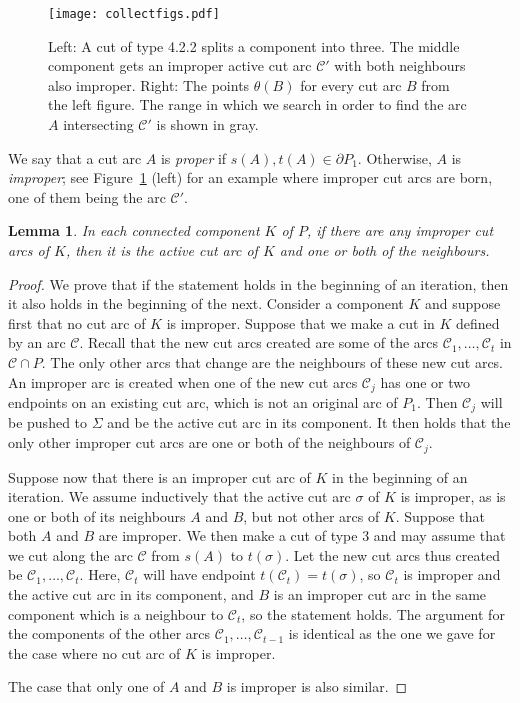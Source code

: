 \documentclass{article}
\newcommand{\PP}{P}
\newcommand{\KO}{K}
\newcommand{\stack}{\Sigma}
\newcommand{\se}{\sigma}
\newcommand{\cut}{\mathcal C}
\newcommand{\start}{s}
\newcommand{\terminal}{t}
\newcommand{\arcA}{A}
\newcommand{\arcB}{B}
\newtheorem{lemma}[theorem]{Lemma}
\begin{document}
\begin{figure}
\centering
\texttt{[image: collectfigs.pdf]}
\caption{Left: A cut of type 4.2.2 splits a component into three.
The middle component gets an improper active cut arc $\cut'$ with both neighbours also improper.
Right: The points $\theta(\arcB)$ for every cut arc $\arcB$ from the left figure.
The range in which we search in order to find the arc $\arcA$ intersecting $\cut'$ is shown in gray.}
\label{fig:improper}
\end{figure}

We say that a cut arc $\arcA$ is \emph{proper} if $\start(\arcA),\terminal(\arcA)\in\partial\PP_1$.
Otherwise, $\arcA$ is \emph{improper}; see Figure~\ref{fig:improper} (left) for an example where improper cut arcs are born, one of them being the arc $\cut'$.

\begin{lemma}\label{lem:improper}
In each connected component $\KO$ of $\PP$, if there are any improper cut arcs of $\KO$, then it is the active cut arc of $\KO$ and one or both of the neighbours.
\end{lemma}

\begin{proof}
We prove that if the statement holds in the beginning of an iteration, then it also holds in the beginning of the next.
Consider a component $\KO$ and suppose first that no cut arc of $\KO$ is improper.
Suppose that we make a cut in $\KO$ defined by an arc $\cut$.
Recall that the new cut arcs created are some of the arcs $\cut_1,\ldots,\cut_t$ in $\cut\cap\PP$.
The only other arcs that change are the neighbours of these new cut arcs.
An improper arc is created when one of the new cut arcs $\cut_j$ has one or two endpoints on an existing cut arc, which is not an original arc of $\PP_1$.
Then $\cut_j$ will be pushed to $\stack$ and be the active cut arc in its component. 
It then holds that the only other improper cut arcs are one or both of the neighbours of $\cut_j$.

Suppose now that there is an improper cut arc of $\KO$ in the beginning of an iteration.
We assume inductively that the active cut arc $\se$ of $\KO$ is improper, as is one or both of its neighbours $\arcA$ and $\arcB$, but not other arcs of $\KO$.
Suppose that both $\arcA$ and $\arcB$ are improper. 
We then make a cut of type 3 and may assume that we cut along the arc $\cut$ from $\start(\arcA)$ to $\terminal(\se)$.
Let the new cut arcs thus created be $\cut_1,\ldots,\cut_t$.
Here, $\cut_t$ will have endpoint $\terminal(\cut_t)=\terminal(\se)$, so $\cut_t$ is improper and the active cut arc in its component, and $\arcB$ is an improper cut arc in the same component which is a neighbour to $\cut_t$, so the statement holds.
The argument for the components of the other arcs $\cut_1,\ldots,\cut_{t-1}$ is identical as the one we gave for the case where no cut arc of $\KO$ is improper.

The case that only one of $\arcA$ and $\arcB$ is improper is also similar.
\end{proof}
\end{document}
